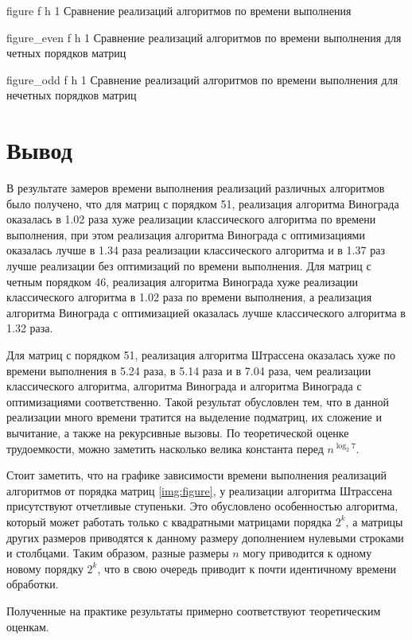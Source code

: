 {figure} %
{f} %
{h} %
{1\textwidth} %
{Сравнение реализаций алгоритмов по времени выполнения} %

{figure_even} %
{f} %
{h} %
{1\textwidth} %
{Сравнение реализаций алгоритмов по времени выполнения для четных порядков матриц} %

{figure_odd} %
{f} %
{h} %
{1\textwidth} %
{Сравнение реализаций алгоритмов по времени выполнения для нечетных порядков матриц} %


\clearpage

\section*{Вывод}

В результате замеров времени выполнения реализаций различных алгоритмов было получено, что для матриц с порядком 51, реализация алгоритма Винограда оказалась в 1.02 раза хуже реализации классического алгоритма по времени выполнения, при этом реализация алгоритма Винограда с оптимизациями оказалась лучше в 1.34 раза реализации классического алгоритма и в 1.37 раз лучше реализации без оптимизаций по времени выполнения. 
Для матриц с четным порядком 46, реализация алгоритма Винограда хуже реализации классического алгоритма в 1.02 раза по времени выполнения, а реализация алгоритма Винограда с оптимизацией оказалась лучше классического алгоритма в 1.32 раза. 

Для матриц с порядком 51, реализация алгоритма Штрассена оказалась хуже по времени выполнения в 5.24 раза, в 5.14 раза и в 7.04 раза, чем реализации классического алгоритма, алгоритма Винограда и алгоритма Винограда с оптимизациями соответственно. 
Такой результат обусловлен тем, что в данной реализации много времени тратится на выделение подматриц, их сложение и вычитание, а также на рекурсивные вызовы. По теоретической оценке трудоемкости, можно заметить насколько велика константа перед $n^{\log_{2}7}$.

Стоит заметить, что на графике зависимости времени выполнения реализаций алгоритмов от порядка матриц \ref{img:figure}, у реализации алгоритма Штрассена присутствуют отчетливые ступеньки.
Это обусловлено особенностью алгоритма, который может работать только с квадратными матрицами порядка $2^k$, а матрицы других размеров приводятся к данному размеру дополнением нулевыми строками и столбцами. 
Таким образом, разные размеры $n$ могу приводится к одному новому порядку $2^k$, что в свою очередь приводит к почти идентичному времени обработки.

Полученные на практике результаты примерно соответствуют теоретическим оценкам.